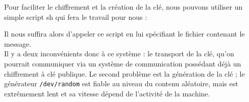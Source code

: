 Pour faciliter le chiffrement et la création de la clé, nous pouvons
utiliser un simple script sh qui fera le travail pour nous : 

\lstset{language=csh}


Il nous suffira alors d'appeler ce script en lui spécifiant le fichier
contenant le message.\\

Il y a deux inconvénients donc à ce système : le transport de la clé,
qu'on pourrait communiquer via un système de communication possédant
déjà un chiffrement à clé publique. Le second problème est la
génération de la clé ; le générateur \texttt{/dev/random} est fiable
au niveau du contenu aléatoire, mais est extrêmement lent et sa
vitesse dépend de l'activité de la machine.

